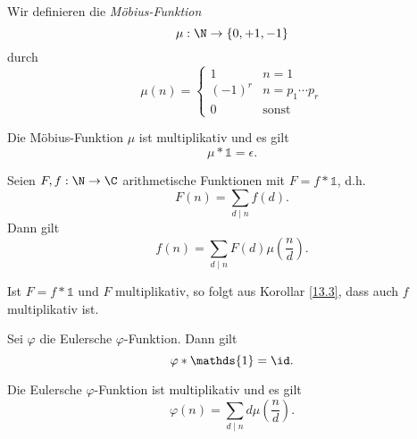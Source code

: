\begin{defn*}
	Wir definieren die \emph{Möbius-Funktion}
	\[ \mu: \N \to \{0,+1,-1\} \]
	durch
	\[ \mu(n) = \begin{cases}
		1 &n=1\\
		(-1)^r &n = p_1 \dotsm p_r\\
		0 &\text{sonst}
	\end{cases} \]
\end{defn*}

\begin{lem}\autolabel
	Die Möbius-Funktion $\mu$ ist multiplikativ und es gilt\[ \mu * \mathds{1} = \epsilon. \]
\end{lem}

\begin{cor}\autolabel
	Seien $F,f: \N \to \C$ arithmetische Funktionen mit $F=f*\mathds{1}$, d.h.
	\[ F(n) = \sum_{d \mid n} f(d). \]
	Dann gilt
	\[ f(n) = \sum_{d \mid n} F(d) \mu \left(\frac{n}{d}\right). \]
\end{cor}

\begin{rem*}
	Ist $F=f*\mathds{1}$ und $F$ multiplikativ, so folgt aus Korollar \ref{13.3}, dass auch $f$ multiplikativ ist.
\end{rem*}

\begin{lem}\autolabel
	Sei $\varphi$ die Eulersche $\varphi$-Funktion. Dann gilt
	\[ \varphi * \mathds{1} = \id. \]
\end{lem}

\begin{cor}\autolabel
	Die Eulersche $\varphi$-Funktion ist multiplikativ und es gilt
	\[ \varphi(n) = \sum_{d \mid n} d \mu \left(\frac{n}{d}\right). \]
\end{cor}
